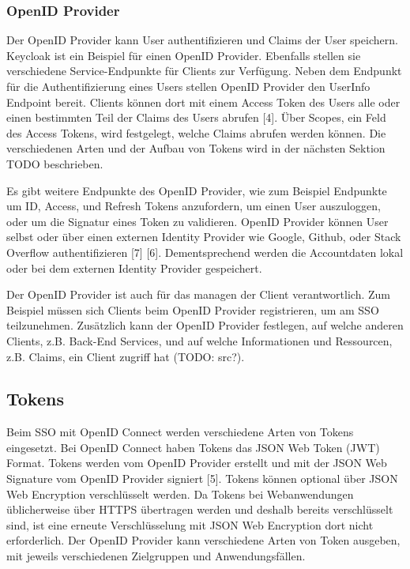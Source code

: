 \subsubsection{OpenID Provider}

Der OpenID Provider kann User authentifizieren und Claims der User speichern. Keycloak ist ein Beispiel für einen OpenID Provider. Ebenfalls stellen sie verschiedene Service-Endpunkte für Clients zur Verfügung. Neben dem Endpunkt für die Authentifizierung eines Users stellen OpenID Provider den UserInfo Endpoint bereit. Clients können dort mit einem Access Token des Users alle oder einen bestimmten Teil der Claims des Users abrufen [4]. Über Scopes, ein Feld des Access Tokens, wird festgelegt, welche Claims abrufen werden können. Die verschiedenen Arten und der Aufbau von Tokens wird in der nächsten Sektion TODO beschrieben.

Es gibt weitere Endpunkte des OpenID Provider, wie zum Beispiel Endpunkte um ID, Access, und Refresh Tokens anzufordern, um einen User auszuloggen, oder um die Signatur eines Token zu validieren. OpenID Provider können User selbst oder über einen externen Identity Provider wie Google, Github, oder Stack Overflow authentifizieren [7] [6]. Dementsprechend werden die Accountdaten lokal oder bei dem externen Identity Provider gespeichert.

Der OpenID Provider ist auch für das managen der Client verantwortlich. Zum Beispiel müssen sich Clients beim OpenID Provider registrieren, um am SSO teilzunehmen. Zusätzlich kann der OpenID Provider festlegen, auf welche anderen Clients, z.B. Back-End Services, und auf welche Informationen und Ressourcen, z.B. Claims, ein Client zugriff hat (TODO: src?).


\subsection{Tokens}

Beim SSO mit OpenID Connect werden verschiedene Arten von Tokens eingesetzt. Bei OpenID Connect haben Tokens das JSON Web Token (JWT) Format. Tokens werden vom OpenID Provider erstellt und mit der JSON Web Signature vom OpenID Provider signiert [5]. Tokens können optional über JSON Web Encryption verschlüsselt werden. Da Tokens bei Webanwendungen üblicherweise über HTTPS übertragen werden und deshalb bereits verschlüsselt sind, ist eine erneute Verschlüsselung mit JSON Web Encryption dort nicht erforderlich. Der OpenID Provider kann verschiedene Arten von Token ausgeben, mit jeweils verschiedenen Zielgruppen und Anwendungsfällen.


